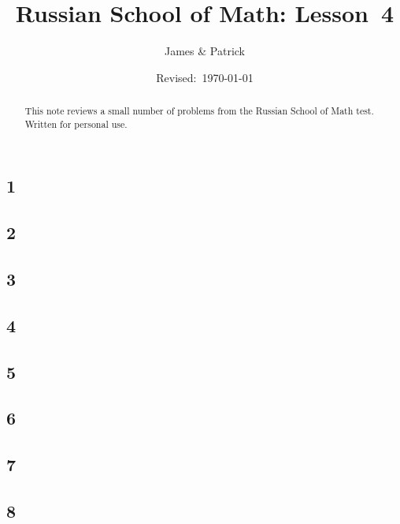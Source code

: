 \documentclass[12pt]{article}
\title{Russian School of Math: Lesson~4}
\author{James \& Patrick}
\date{Revised:~\today}
\begin{document}
\maketitle
\begin{abstract}\setlength{\parindent}{0pt}%
This note reviews a small number of problems from the Russian School of Math test. Written for personal use.
\end{abstract}

\thispagestyle{empty}
\clearpage

\subsection*{1}

\begin{solution}
  
\end{solution}

\subsection*{2}

\begin{solution}
  
\end{solution}

\subsection*{3}

\begin{solution}
  
\end{solution}

\subsection*{4}

\begin{solution}
  
\end{solution}

\subsection*{5}

\begin{solution}
  
\end{solution}

\subsection*{6}

\begin{solution}
  
\end{solution}
\newpage
\subsection*{7}

\begin{solution}
  
\end{solution}

\subsection*{8}

\begin{solution}
  
\end{solution}
\end{document}
